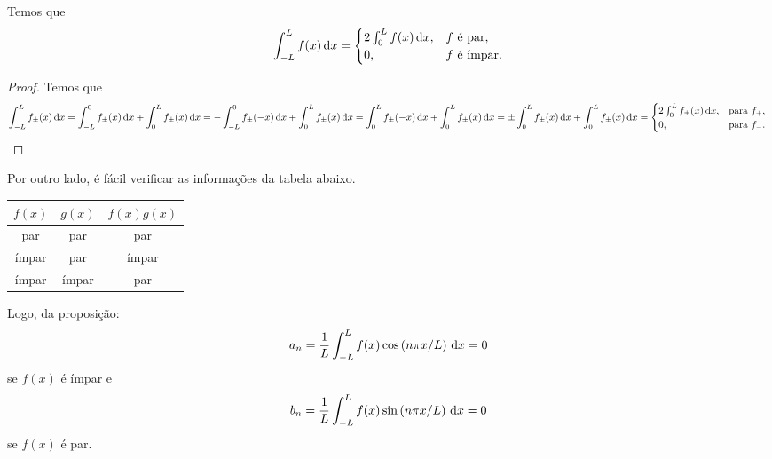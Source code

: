 \begin{prop}
  Temos que
  \begin{dmath*}
    \int_{-L}^L f(x) \vi{x} = \begin{cases}
      2 \int_0^L f(x) \vi{x}, & f \text{ é par}, \\
      0, & f \text{ é ímpar}.
    \end{cases}
  \end{dmath*}
\end{prop}
\begin{proof}
  Temos que
  \begin{dmath*}
    \int_{-L}^L f_\pm(x) \vi{x} = \int_{-L}^0 f_\pm(x) \vi{x} + \int_0^L f_\pm(x) \vi{x}
    = -\int_{-L}^0 f_\pm(-x) \vi{x} + \int_0^L f_\pm(x) \vi{x}
    = \int_0^L f_\pm(-x) \vi{x} + \int_0^L f_\pm(x) \vi{x}
    = \pm \int_0^L f_\pm(x) \vi{x} + \int_0^L f_\pm(x) \vi{x}
    = \begin{cases}
      2 \int_0^L f_\pm(x) \vi{x}, & \text{para } f_+, \\
      0, & \text{para } f_-.
    \end{cases} \qedhere
  \end{dmath*}
\end{proof}

Por outro lado, é fácil verificar as informações da tabela abaixo.
\begin{table}[htb]
  \centering
  \begin{tabular}{|c|c|c|}
    \hline
    $f(x)$ & $g(x)$ & $f(x) g(x)$ \\ \hline
    par & par & par \\ \hline
    ímpar & par & ímpar \\ \hline
    ímpar & ímpar & par \\ \hline
  \end{tabular}
\end{table}

Logo, da proposição:
\begin{dmath*}
  a_n = \frac{1}{L} \int_{-L}^L f(x) \cos\left( n \pi x / L \right) \vi{x} = 0
\end{dmath*}
se $f(x)$ é ímpar e
\begin{dmath*}
  b_n = \frac{1}{L} \int_{-L}^L f(x) \sin\left( n \pi x / L \right) \vi{x} = 0
\end{dmath*}
se $f(x)$ é par.

